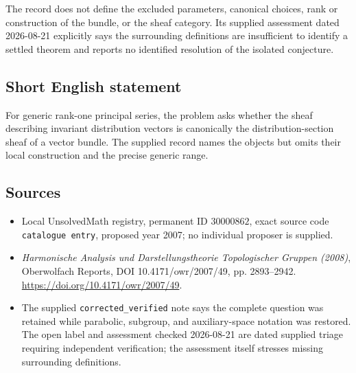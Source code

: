 \documentclass[11pt]{article}
\begin{document}
The record does not define the excluded parameters, canonical choices, rank or construction of the bundle, or the sheaf category. Its supplied assessment dated 2026-08-21 explicitly says the surrounding definitions are insufficient to identify a settled theorem and reports no identified resolution of the isolated conjecture.
\subsection{Short English statement}
For generic rank-one principal series, the problem asks whether the sheaf describing invariant distribution vectors is canonically the distribution-section sheaf of a vector bundle. The supplied record names the objects but omits their local construction and the precise generic range.
\subsection{Sources}
\begin{itemize}
\item Local UnsolvedMath registry, permanent ID \(30000862\), exact source code \texttt{catalogue entry}, proposed year 2007; no individual proposer is supplied.
\item \emph{Harmonische Analysis und Darstellungstheorie Topologischer Gruppen (2008)}, Oberwolfach Reports, DOI 10.4171/owr/2007/49, pp. 2893--2942. \url{https://doi.org/10.4171/owr/2007/49}.
\item The supplied \texttt{corrected\_verified} note says the complete question was retained while parabolic, subgroup, and auxiliary-space notation was restored. The open label and assessment checked 2026-08-21 are dated supplied triage requiring independent verification; the assessment itself stresses missing surrounding definitions.
\end{itemize}
\end{document}
